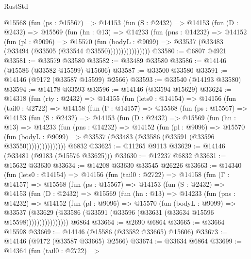 \begin{lexlean}{RustStd}
\begin{coremodule}
            @15568
              (fun (ps : @15567) =>
              @14153
                (fun (S : @2432) =>
                @14153
                  (fun (D : @2432) =>
                  @15569
                    (fun (hn : @13) =>
                    @14233
                      (fun (pns : @14232) =>
                      @14152
                        (fun (pl : @9096) =>
                        @15570
                          (fun (bodyL : @9099) =>
                          @33537 (@33483 (@33494 (@33505 (@33544 @33550))))))))))))))))
@33580 := @6807 @4921
@33581 := @33579 @33580
@33582 := @33489 @33580
@33586 := @14146 (@15586 (@33582 @15599) @15606)
@33587 := @33500 @33580
@33591 := @14146 (@9172 (@33587 @15599) @2566)
@33593 := @33540 (@14193 @33580)
@33594 := @14178 @33593
@33596 := @14146 (@33594 @15629)
@33624 := @14318
    (fun (rty : @2432) =>
    @14155
      (fun (lets0 : @14154) =>
      @14156
        (fun (tail0 : @2722) =>
        @14158
          (fun (Γ : @14157) =>
          @15568
            (fun (ps : @15567) =>
            @14153
              (fun (S : @2432) =>
              @14153
                (fun (D : @2432) =>
                @15569
                  (fun (hn : @13) =>
                  @14233
                    (fun (pns : @14232) =>
                    @14152
                      (fun (pl : @9096) =>
                      @15570
                        (fun (bodyL : @9099) =>
                        @33537 (@33483 (@33586 (@33591 (@33596 @33550)))))))))))))))
    @6832
@33625 := @11265 @9113
@33629 := @14146 (@33481 (@9183 (@15576 @33625)))
@33630 := @12237 @6832
@33631 := @15632 @33630
@33634 := @14208 @33630 @33545 @26226
@33663 := @14340
    (fun (lets0 : @14154) =>
    @14156
      (fun (tail0 : @2722) =>
      @14158
        (fun (Γ : @14157) =>
        @15568
          (fun (ps : @15567) =>
          @14153
            (fun (S : @2432) =>
            @14153
              (fun (D : @2432) =>
              @15569
                (fun (hn : @13) =>
                @14233
                  (fun (pns : @14232) =>
                  @14152
                    (fun (pl : @9096) =>
                    @15570
                      (fun (bodyL : @9099) =>
                      @33537
                        (@33629
                          (@33586 (@33591 (@33596 (@33631 (@33634 @15596 @15598))))))))))))))))
    @6864
@33664 := @2690 @6864
@33665 := @33664 @15598
@33669 := @14146 (@15586 (@33582 @33665) @15606)
@33673 := @14146 (@9172 (@33587 @33665) @2566)
@33674 := @33634 @6864
@33699 := @14364
    (fun (tail0 : @2722) =>

\end{coremodule}
\end{lexlean}

